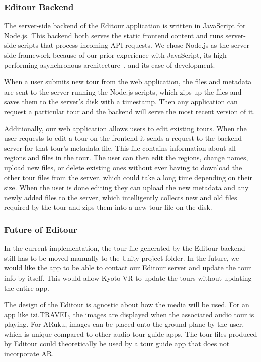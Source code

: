 \documentclass[a4paper, 10pt, american, titlepage]{article}
\begin{document}
\subsubsection{Editour Backend}
\label{sec:editourBackend}

The server-side backend of the Editour application is written in JavaScript for
Node.js. This backend both serves the static frontend content and runs
server-side scripts that process incoming API requests.  We chose Node.js as the
server-side framework because of our prior experience with JavaScript, its
high-performing asynchronous architecture~\autocite{orsini2013}, and its ease of
development.

When a user submits new tour from the web application, the files and metadata
are sent to the server running the Node.js scripts, which zips up the files and
saves them to the server's disk with a timestamp. Then any application can
request a particular tour and the backend will serve the most recent version of
it.

Additionally, our web application allows users to edit existing tours. When the
user requests to edit a tour on the frontend it sends a request to the backend
server for that tour's metadata file. This file contains information about all
regions and files in the tour. The user can then edit the regions, change names,
upload new files, or delete existing ones without ever having to download the
other tour files from the server, which could take a long time depending on
their size. When the user is done editing they can upload the new metadata and
any newly added files to the server, which intelligently collects new and old
files required by the tour and zips them into a new tour file on the disk.


\subsubsection{Future of Editour}
\label{sec:futureOfEditour}

In the current implementation, the tour file generated by the Editour backend
still has to be moved manually to the Unity project folder. In the future, we
would like the app to be able to contact our Editour server and update the tour
info by itself. This would allow Kyoto VR to update the tours without updating
the entire app.

The design of the Editour is agnostic about how the media will be used.  For
an app like izi.TRAVEL, the images are displayed when the associated audio
tour is playing. For ARuku, images can be placed onto the ground plane by the
user, which is unique compared to other audio tour guide apps. The tour files
produced by Editour could theoretically be used by a tour guide app that does
not incorporate AR. 
\end{document}
